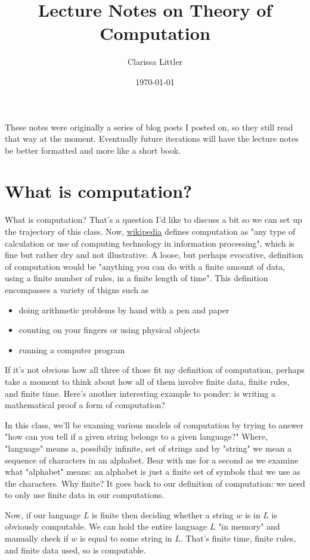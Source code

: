\documentclass[11pt]{article}
\author{Clarissa Littler}
\date{\today}
\title{Lecture Notes on Theory of Computation}
\begin{document}
\maketitle
These notes were originally a series of blog posts I posted on, so they still read that way at the moment. Eventually future iterations will have the lecture notes be better formatted and more like a short book. 
\section{What is computation?}
\label{sec-1}
What is computation? That's a question I'd like to discuss a bit so we can set up the trajectory of this class. Now, \href{http://en.wikipedia.org/wiki/Computation}{wikipedia} defines computation as "any type of calculation or use of computing technology in information processing", which is fine but rather dry and not illustrative. A loose, but perhaps evocative, definition of computation would be "anything you can do with a finite amount of data, using a finite number of rules, in a finite length of time". This definition encompasses a variety of thigns such as 
\begin{itemize}
\item doing arithmetic problems by hand with a pen and paper
\item counting on your fingers or using physical objects
\item running a computer program
\end{itemize}
If it's not obvious how all three of those fit my definition of computation, perhaps take a moment to think about how all of them involve finite data, finite rules, and finite time. Here's another interesting example to ponder: is writing a mathematical proof a form of computation?

In this class, we'll be examing various models of computation by trying to answer "how can you tell if a given string belongs to a given language?" Where, "language" means a, possibily infinite, set of strings and by "string" we mean a sequence of characters in an alphabet. Bear with me for a second as we examine what "alphabet" means: an alphabet is just a finite set of symbols that we use as the characters. Why finite? It goes back to our definition of computation: we need to only use finite data in our computations.

Now, if our language $L$ is finite then deciding whether a string $w$ is in $L$ is obviously computable. We can hold the entire language $L$ "in memory" and manually check if $w$ is equal to some string in $L$. That's finite time, finite rules, and finite data used, so is computable.
\end{document}
